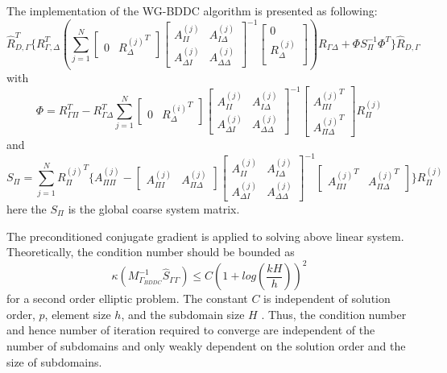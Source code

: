 The implementation of the WG-BDDC algorithm is presented as following:
\begin{equation}
\hat{R}_{D,\Gamma}^{T} \{ R_{\Gamma, \Delta}^{T} (\sum_{j = 1}^{N}\begin{bmatrix}
0 & {R_{\Delta}^{(j)}}^{T}
\end{bmatrix} \begin{bmatrix}
A_{II}^{(j)} & A_{I \Delta}^{(j)} \\
A_{\Delta I}^{(j)} & A_{\Delta \Delta}^{(j)}
\end{bmatrix}^{-1} \begin{bmatrix}
0 \\ R_{\Delta}^{(j)}\\
\end{bmatrix} )  R_{\Gamma \Delta} + \Phi S_{\Pi}^{-1} \Phi^{T}\} \hat{R}_{D, \Gamma}
\end{equation}
with
\begin{equation}
\Phi = R_{\Gamma\Pi}^{T} - R_{\Gamma \Delta}^{T} \sum_{j = 1}^{N} \begin{bmatrix}
0 & {R_{\Delta}^{(i)}}^{T} 
\end{bmatrix} \begin{bmatrix}
A_{II}^{(j)} & A_{I \Delta}^{(j)} \\
A_{\Delta I}^{(j)} & A_{\Delta \Delta}^{(j)}
\end{bmatrix}^{-1} \begin{bmatrix}
{A_{\Pi I}^{(j)}}^{T} \\ {A_{\Pi \Delta}^{(j)}}^{T} 
\end{bmatrix} R_{\Pi}^{(j)}
\end{equation}
and 
\begin{equation}
S_{\Pi} = \sum_{j = 1}^{N} {R_{\Pi}^{(j)}}^{T} \{ A_{\Pi \Pi}^{(j)} - \begin{bmatrix}
A_{\Pi I}^{(j)} & A_{\Pi \Delta}^{(j)}
\end{bmatrix}  \begin{bmatrix}
A_{II}^{(j)} & A_{I\Delta}^{(j)} \\
A_{\Delta I}^{(j)} & A_{\Delta \Delta}^{(j)}
\end{bmatrix}^{-1} \begin{bmatrix}
{A_{\Pi I}^{(j)}}^{T} & {A_{\Pi \Delta}^{(j)}}^{T}
\end{bmatrix} \} R_{\Pi}^{(j)}
\end{equation}
here the $ S_{\Pi} $ is the global coarse system matrix.

The preconditioned conjugate gradient is applied to solving above linear system. Theoretically, the condition number should be bounded as
\begin{equation}
\kappa (M_{\Gamma_{BDDC}}^{-1} \hat{S}_{\Gamma \Gamma}) \leq C (1 + log (\frac{kH}{h}))^{2}
\end{equation}
for a second order elliptic problem. The constant $ C $  is independent of solution order, $ p $, element size $ h $,  and the subdomain size $ H $ . Thus, the condition number and hence number of iteration required to converge are independent of the number of subdomains and only weakly dependent on the solution order and the size of subdomains.  

